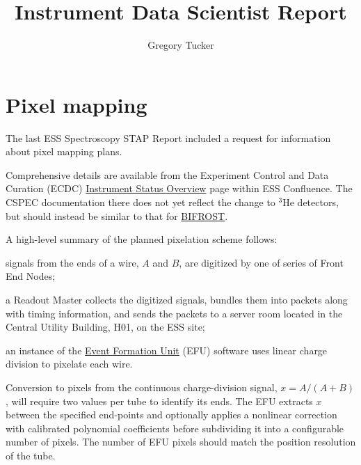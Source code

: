 \documentclass[a4paper, twocolumn, 10pt, revision]{ess}
\newcommand{\pdfsubject}{Spectroscopy Scientific and Technical Advisory Panel}
\newcommand{\pdftitle}{Instrument Data Scientist Report}
\newcommand{\pdfauthor}{Gregory Tucker}
\begin{document}
\titlehead{\pdfsubject \hfill Revision: \revision}
\title{\pdftitle}
\author{\pdfauthor}
\date{\revisiondate}
\maketitle


\section{Pixel mapping}
The last ESS Spectroscopy STAP Report \autocite{spectroscopy_stap_2022} included a request for information about pixel mapping plans.

Comprehensive details are available from the Experiment Control and Data Curation (ECDC)
\href{https://confluence.esss.lu.se/display/ECDC/Instrument+Status+Overview}{Instrument Status Overview} page within 
ESS Confluence.
The CSPEC documentation there does not yet reflect the change to $^3$He detectors,
but should instead be similar to that for \href{https://project.esss.dk/owncloud/index.php/s/4M60TNdqkMcppUX}{BIFROST}.

A high-level summary of the planned pixelation scheme follows:
\begin{inparaenum}
\item signals from the ends of a wire, $A$ and $B$, are digitized by one of series of Front End Nodes;
\item a Readout Master collects the digitized signals, bundles them into packets along with timing information, and sends the packets to a server room located in the Central Utility Building, H01, on the ESS site;
\item an instance of the \href{https://github.com/ess-dmsc/event-formation-unit}{Event Formation Unit} (EFU) software uses linear charge division to pixelate each wire.
\end{inparaenum}

Conversion to pixels from the continuous charge-division signal, $x = A/(A+B)$, will require two values per tube to identify its ends.
The EFU extracts $x$ between the specified end-points and optionally applies a nonlinear correction with calibrated polynomial coefficients
before subdividing it into a configurable number of pixels.
The number of EFU pixels should match the position resolution of the tube.
\end{document}
